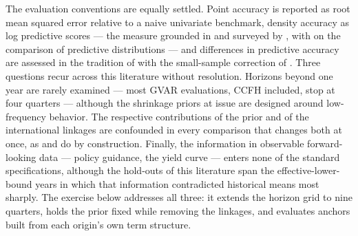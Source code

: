 The evaluation conventions are equally settled. Point accuracy is reported as root mean
squared error relative to a naive univariate benchmark, density accuracy as log
predictive scores --- the measure grounded in \citet{Geweke2001} and surveyed by
\citet{GewekeWhiteman2006}, with \citet{GewekeAmisano2010} on the comparison of
predictive distributions --- and differences in predictive accuracy are
assessed in the tradition of \citet{DieboldMariano1995} with the small-sample correction
of \citet{HarveyLeybourneNewbold1997}. Three questions recur across this literature
without resolution. Horizons beyond one year are rarely examined --- most GVAR
evaluations, CCFH included, stop at four quarters --- although the shrinkage priors at
issue are designed around low-frequency behavior. The respective contributions of the
prior and of the international linkages are confounded in every comparison that changes
both at once, as \citet{PesaranSchuermannSmith2009} and
\citet{CrespoFeldkircherHuber2016} do by construction. Finally, the information in
observable forward-looking data --- policy guidance, the yield curve --- enters none of
the standard specifications, although the hold-outs of this literature span the
effective-lower-bound years in which that information contradicted historical means most
sharply. The exercise below addresses all three: it extends the horizon grid to nine
quarters, holds the prior fixed while removing the linkages, and evaluates anchors built
from each origin's own term structure.

